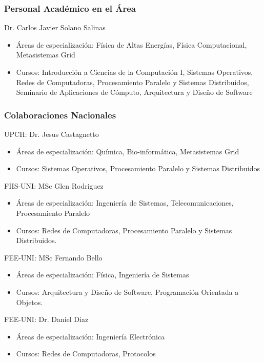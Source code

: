 \subsubsection{Personal Acad\'emico en el \'Area}

Dr. Carlos Javier Solano Salinas
\begin{itemize}
\item \'Areas de especializaci\'on: F\'isica de Altas Energ\'ias, F\'isica Computacional, Metasistemas Grid
\item Cursos: Introducci\'on a Ciencias de la Computaci\'on I, Sistemas Operativos, Redes de Computadoras, Procesamiento Paralelo y Sistemas Distribuidos, Seminario de Aplicaciones de C\'omputo, Arquitectura y Dise\~no de Software
\end{itemize}

\subsubsection{Colaboraciones Nacionales}

UPCH: Dr. Jesus Castagnetto
\begin{itemize}
\item \'Areas de especializaci\'on: Qu\'imica, Bio-inform\'atica, Metasistemas Grid
\item Cursos: Sistemas Operativos, Procesamiento Paralelo y Sistemas Distribuidos
\end{itemize}

FIIS-UNI: MSc Glen Rodriguez
\begin{itemize}
\item \'Areas de especializaci\'on: Ingenier\'ia de Sistemas, Telecomunicaciones, Procesamiento Paralelo 
\item Cursos: Redes de Computadoras, Procesamiento Paralelo y  Sistemas Distribuidos.
\end{itemize}

FEE-UNI: MSc Fernando Bello
\begin{itemize}
\item \'Areas de especializaci\'on: F\'isica, Ingenier\'ia de Sistemas
\item Cursos: Arquitectura y Dise\~no de Software, Programaci\'on Orientada a Objetos.
\end{itemize}

FEE-UNI: Dr. Daniel Diaz
\begin{itemize}
\item \'Areas de especializaci\'on: Ingenier\'ia Electr\'onica
\item Cursos: Redes de Computadoras, Protocolos
\end{itemize}

